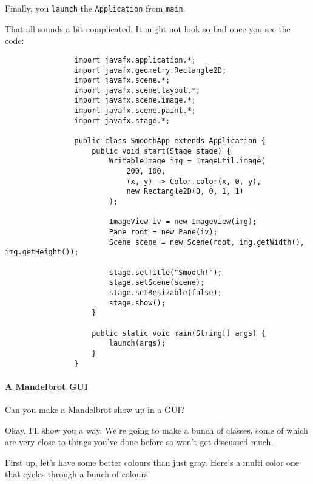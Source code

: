 \documentclass{article}
\begin{document}
            Finally, you \texttt{launch} the \texttt{Application} from \texttt{main}.
            
            That all sounds a bit complicated.  It might not look so bad once you see the code:
            
            \begin{verbatim}            
                import javafx.application.*;
                import javafx.geometry.Rectangle2D;
                import javafx.scene.*;
                import javafx.scene.layout.*;
                import javafx.scene.image.*;
                import javafx.scene.paint.*;
                import javafx.stage.*;

                public class SmoothApp extends Application {
                    public void start(Stage stage) {
                        WritableImage img = ImageUtil.image(
                            200, 100,
                            (x, y) -> Color.color(x, 0, y),
                            new Rectangle2D(0, 0, 1, 1)
                        );
        
                        ImageView iv = new ImageView(img);
                        Pane root = new Pane(iv);
                        Scene scene = new Scene(root, img.getWidth(), img.getHeight());

                        stage.setTitle("Smooth!");
                        stage.setScene(scene);
                        stage.setResizable(false);
                        stage.show();
                    }

                    public static void main(String[] args) {
                        launch(args);
                    }
                }
            \end{verbatim}
        
        \newpage
        \paragraph{A Mandelbrot GUI}
            Can you make a Mandelbrot show up in a GUI?
            
            Okay, I'll show you a way. We're going to make a bunch of classes, some of which are very close to things you've done before so
            won't get discussed much.
            
            First up, let's have some better colours than just gray.  Here's a multi color one that cycles through a bunch of colours:
            
\end{document}
